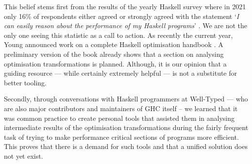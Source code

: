 This belief stems first from the results of the yearly
Haskell survey where in 2021 only 16\% of respondents either agreed or strongly agreed with the
statement `\textit{I can easily reason about the performance of my Haskell programs}' \cite{haskell_survey_2021}.
We are not the only one seeing this statistic as a call to action. As recently the current year,
Young announced work on a complete Haskell optimisation handbook \cite{optimisation_handbook}.
A preliminary version of the book already shows that a section on analysing optimisation transformations
is planned. Although, it is our opinion that a guiding resource --- while certainly extremely helpful ---
is not a substitute for better tooling.

Secondly, through conversations with Haskell programmers at Well-Typed --- who are also major contributors
and maintainers of GHC itself -- we learned that it was common practice to create personal tools that
assisted them in analysing intermediate results of the optimisation transformations during the fairly
frequent task of trying to make performance critical sections of programs more efficient. 
This proves that there is a demand for such tools and that a unified solution does not yet exist.

